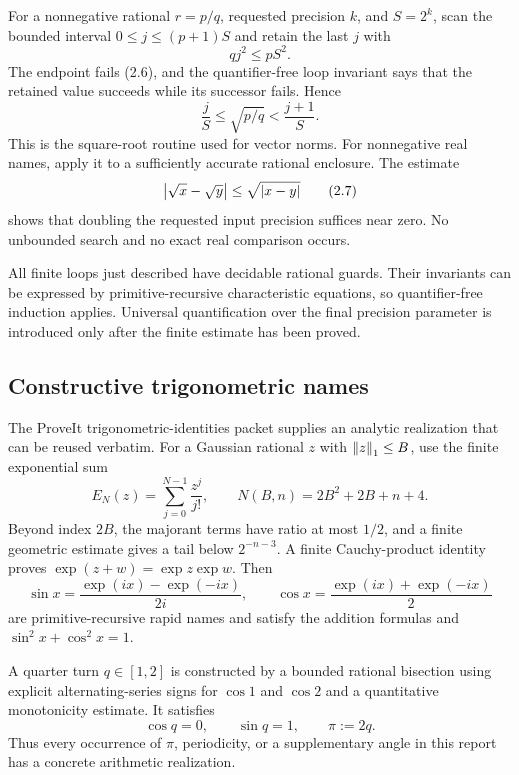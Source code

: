 For a nonnegative rational \(r=p/q\), requested precision \(k\), and
\(S=2^k\), scan the bounded interval
\(0\le j\le(p+1)S\) and retain the last \(j\) with
\begin{equation}
 qj^2\le pS^2.                                                \tag{2.6}
\end{equation}
The endpoint fails (2.6), and the quantifier-free loop invariant says that the
retained value succeeds while its successor fails.  Hence
\[
 \frac jS\le\sqrt{p/q}<\frac{j+1}{S}.
\]
This is the square-root routine used for vector norms.  For nonnegative real
names, apply it to a sufficiently accurate rational enclosure.  The estimate
\begin{equation}
 \left|\sqrt{x}-\sqrt{y}\right|\le\sqrt{\left|x-y\right|}                 \tag{2.7}
\end{equation}
shows that doubling the requested input precision suffices near zero.  No
unbounded search and no exact real comparison occurs.

All finite loops just described have decidable rational guards.  Their
invariants can be expressed by primitive-recursive characteristic equations,
so quantifier-free induction applies.  Universal quantification over the final
precision parameter is introduced only after the finite estimate has been
proved.

\subsection{Constructive trigonometric names}
\label{subsec:trig-names}

The ProveIt trigonometric-identities packet supplies an analytic realization
that can be reused verbatim.  For a Gaussian rational \(z\) with
\(\left\lVert z\right\rVert_1\le B\), use the finite exponential sum
\[
 E_N(z)=\sum_{j=0}^{N-1}\frac{z^j}{j!},
 \qquad N(B,n)=2B^2+2B+n+4.                                 \tag{2.8}
\]
Beyond index \(2B\), the majorant terms have ratio at most \(1/2\), and a
finite geometric estimate gives a tail below \(2^{-n-3}\).  A finite
Cauchy-product identity proves
\(\exp(z+w)=\exp z\exp w\).  Then
\begin{equation}
 \sin x=\frac{\exp(ix)-\exp(-ix)}{2i},\qquad
 \cos x=\frac{\exp(ix)+\exp(-ix)}2                         \tag{2.9}
\end{equation}
are primitive-recursive rapid names and satisfy the addition formulas and
\(\sin^2x+\cos^2x=1\).

A quarter turn \(q\in[1,2]\) is constructed by a bounded rational bisection
using explicit alternating-series signs for \(\cos1\) and \(\cos2\) and a
quantitative monotonicity estimate.  It satisfies
\begin{equation}
 \cos q=0,\qquad \sin q=1,
 \qquad \pi:=2q.                                             \tag{2.10}
\end{equation}
Thus every occurrence of \(\pi\), periodicity, or a supplementary angle in this
report has a concrete arithmetic realization.

